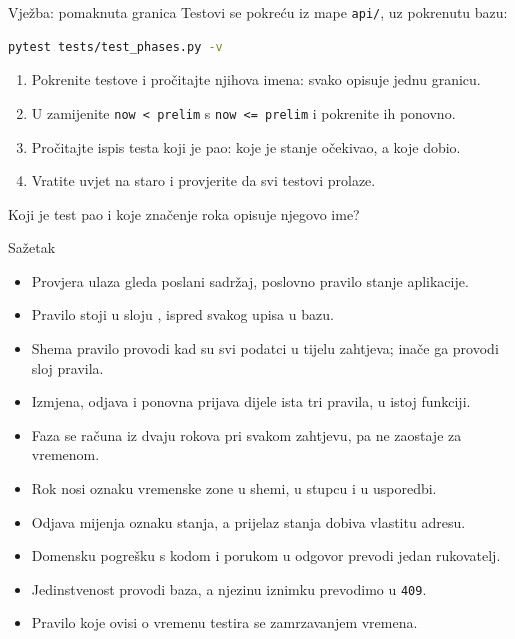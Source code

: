 \begin{frame}[fragile]{Vježba: pomaknuta granica}
Testovi se pokreću iz mape \texttt{api/}, uz pokrenutu bazu:

\begin{lstlisting}[language=bash]
pytest tests/test_phases.py -v
\end{lstlisting}

\vspace{0.8em}
\begin{enumerate}
  \itemsep0.4em
  \item Pokrenite testove i pročitajte njihova imena: svako opisuje jednu granicu.
  \item U  zamijenite \texttt{now < prelim} s \texttt{now <= prelim} i pokrenite ih ponovno.
  \item Pročitajte ispis testa koji je pao: koje je stanje očekivao, a koje dobio.
  \item Vratite uvjet na staro i provjerite da svi testovi prolaze.
\end{enumerate}

\vspace{0.8em}
Koji je test pao i koje značenje roka opisuje njegovo ime?
\end{frame}

\begin{frame}{Sažetak}
\begin{itemize}
  \item Provjera ulaza gleda poslani sadržaj, poslovno pravilo stanje aplikacije.
  \item Pravilo stoji u sloju , ispred svakog upisa u bazu.
  \item Shema pravilo provodi kad su svi podatci u tijelu zahtjeva; inače ga provodi sloj pravila.
  \item Izmjena, odjava i ponovna prijava dijele ista tri pravila, u istoj funkciji.
  \item Faza se računa iz dvaju rokova pri svakom zahtjevu, pa ne zaostaje za vremenom.
  \item Rok nosi oznaku vremenske zone u shemi, u stupcu i u usporedbi.
  \item Odjava mijenja oznaku stanja, a prijelaz stanja dobiva vlastitu adresu.
  \item Domensku pogrešku s kodom i porukom u odgovor prevodi jedan rukovatelj.
  \item Jedinstvenost provodi baza, a njezinu iznimku prevodimo u \texttt{409}.
  \item Pravilo koje ovisi o vremenu testira se zamrzavanjem vremena.
\end{itemize}
\end{frame}


